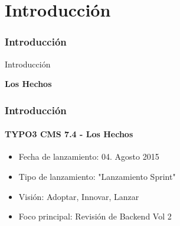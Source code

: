 %

\section{Introducción}
\begin{frame}[fragile]
	\frametitle{Introducción}

	\begin{center}\huge{Introducción}\end{center}
	\begin{center}\huge{\color{typo3darkgrey}\textbf{Los Hechos}}\end{center}

\end{frame}

\begin{frame}[fragile]
	\frametitle{Introducción}
	\framesubtitle{TYPO3 CMS 7.4 - Los Hechos}

	\begin{itemize}
		\item Fecha de lanzamiento: 04. Agosto 2015
		\item Tipo de lanzamiento: "Lanzamiento Sprint"
		\item Visión: Adoptar, Innovar, Lanzar
		\item Foco principal: Revisión de Backend Vol 2
	\end{itemize}

\end{frame}

